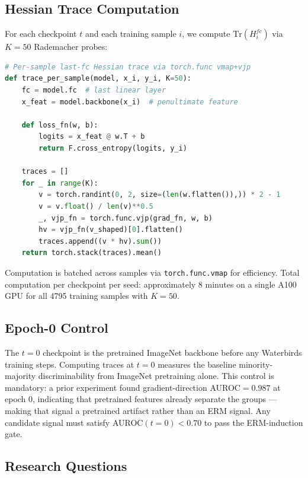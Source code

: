 \subsection{Hessian Trace Computation}

For each checkpoint $t$ and each training sample $i$, we compute $\text{Tr}(H_i^{fc})$ via $K{=}50$ Rademacher probes:

\begin{lstlisting}[language=Python, basicstyle=\small\ttfamily, breaklines=true]
# Per-sample last-fc Hessian trace via torch.func vmap+vjp
def trace_per_sample(model, x_i, y_i, K=50):
    fc = model.fc  # last linear layer
    x_feat = model.backbone(x_i)  # penultimate feature

    def loss_fn(w, b):
        logits = x_feat @ w.T + b
        return F.cross_entropy(logits, y_i)

    traces = []
    for _ in range(K):
        v = torch.randint(0, 2, size=(len(w.flatten()),)) * 2 - 1
        v = v.float() / len(v)**0.5
        _, vjp_fn = torch.func.vjp(grad_fn, w, b)
        hv = vjp_fn(v_shaped)[0].flatten()
        traces.append((v * hv).sum())
    return torch.stack(traces).mean()
\end{lstlisting}

Computation is batched across samples via \texttt{torch.func.vmap} for efficiency. Total computation per checkpoint per seed: approximately 8 minutes on a single A100 GPU for all 4795 training samples with $K{=}50$.

\subsection{Epoch-0 Control}
\label{sec:epoch0-control}

The $t{=}0$ checkpoint is the pretrained ImageNet backbone before any Waterbirds training steps. Computing traces at $t{=}0$ measures the baseline minority-majority discriminability from ImageNet pretraining alone. This control is mandatory: a prior experiment found gradient-direction AUROC$=0.987$ at epoch 0, indicating that pretrained features already separate the groups --- making that signal a pretrained artifact rather than an ERM signal. Any candidate signal must satisfy AUROC$(t{=}0) < 0.70$ to pass the ERM-induction gate.

\subsection{Research Questions}

